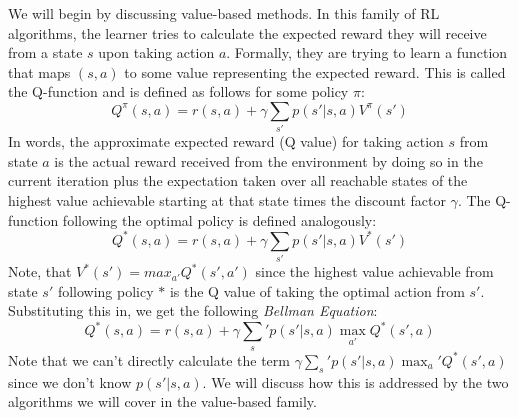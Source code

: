 \noindent We will begin by discussing value-based methods. In this family of RL algorithms, the learner tries to calculate the expected reward they will receive from a state $s$ upon taking action $a$. Formally, they are trying to learn a function that maps $(s, a)$ to some value representing the expected reward. This is called the Q-function and is defined as follows for some policy $\pi$:
\begin{equation}
    Q^{\pi}(s, a) = r(s, a) + \gamma\sum_{s'}p(s'|s, a)V^{\pi}(s')
\end{equation}
In words, the approximate expected reward (Q value) for taking action $s$ from state $a$ is the actual reward received from the environment by doing so in the current iteration plus the expectation taken over all reachable states of the highest value achievable starting at that state times the discount factor $\gamma$. The Q-function following the optimal policy is defined analogously:
\begin{equation}
    Q^{*}(s, a) = r(s, a) + \gamma\sum_{s'}p(s'|s, a)V^{*}(s')
\end{equation}
Note, that $V^*(s') = max_{a'}Q^*(s', a')$ since the highest value achievable from state $s'$ following policy $*$ is the Q value of taking the optimal action from $s'$. Substituting this in, we get the following \textit{Bellman Equation}:
\begin{equation}
    Q^*(s, a) = r(s, a) + \gamma\sum_s'p(s'|s, a)\max_{a'}Q^*(s', a)
\end{equation}
Note that we can't directly calculate the term $\gamma\sum_s'p(s'|s, a)\max_a'Q^*(s', a)$ since we don't know $p(s'|s, a)$. We will discuss how this is addressed by the two algorithms we will cover in the value-based family.
